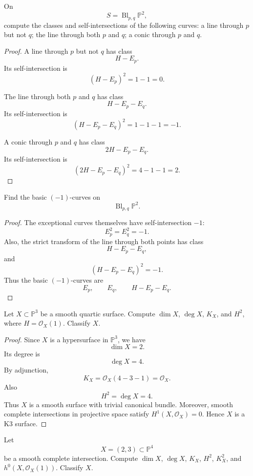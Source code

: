 \begin{exercise}
\label{exercise-two-point-curves}
On
$$
  S=\operatorname{Bl}_{p,q}\mathbb P^2,
$$
compute the classes and self-intersections
of the following curves:
a line through $p$ but not $q$;
the line through both $p$ and $q$;
a conic through $p$ and $q$.
\end{exercise}

\begin{proof}
A line through $p$ but not $q$ has class
$$
  H-E_p.
$$
Its self-intersection is
$$
  (H-E_p)^2=1-1=0.
$$

The line through both $p$ and $q$ has
class
$$
  H-E_p-E_q.
$$
Its self-intersection is
$$
  (H-E_p-E_q)^2=1-1-1=-1.
$$

A conic through $p$ and $q$ has class
$$
  2H-E_p-E_q.
$$
Its self-intersection is
$$
  (2H-E_p-E_q)^2=4-1-1=2.
$$
\end{proof}

\begin{exercise}
\label{exercise-minus-one-curves}
Find the basic $(-1)$-curves on
$$
  \operatorname{Bl}_{p,q}\mathbb P^2.
$$
\end{exercise}

\begin{proof}
The exceptional curves themselves have
self-intersection $-1$:
$$
  E_p^2=E_q^2=-1.
$$
Also, the strict transform of the line
through both points has class
$$
  H-E_p-E_q,
$$
and
$$
  (H-E_p-E_q)^2=-1.
$$
Thus the basic $(-1)$-curves are
$$
  E_p,\qquad E_q,\qquad H-E_p-E_q.
$$
\end{proof}


\begin{exercise}
\label{exercise-quartic-surface}
Let $X\subset \mathbb P^3$ be a smooth
quartic surface. Compute $\dim X$,
$\deg X$, $K_X$, and $H^2$, where
$H=\mathcal O_X(1)$. Classify $X$.
\end{exercise}

\begin{proof}
Since $X$ is a hypersurface in
$\mathbb P^3$, we have
$$
  \dim X=2.
$$
Its degree is
$$
  \deg X=4.
$$
By adjunction,
$$
  K_X
  =
  \mathcal O_X(4-3-1)
  =
  \mathcal O_X.
$$
Also
$$
  H^2=\deg X=4.
$$
Thus $X$ is a smooth surface with trivial
canonical bundle. Moreover, smooth
complete intersections in projective
space satisfy $H^1(X,\mathcal O_X)=0$.
Hence $X$ is a K3 surface.
\end{proof}

\begin{exercise}
\label{exercise-two-three-surface}
Let
$$
  X=(2,3)\subset \mathbb P^4
$$
be a smooth complete intersection.
Compute $\dim X$, $\deg X$, $K_X$,
$H^2$, $K_X^2$, and
$h^0(X,\mathcal O_X(1))$. Classify $X$.
\end{exercise}

